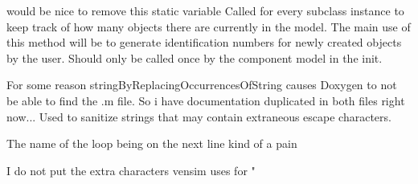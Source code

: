 
\begin{DoxyRefList}
\item[\label{todo__todo000001}%
\hypertarget{todo__todo000001}{}%
Global \hyperlink{interface_component_a3d13675a50c2e37e16e1b7858e5510e4}{\mbox{[}Component generate\-I\-D\mbox{]}} ]would be nice to remove this static variable Called for every subclass instance to keep track of how many objects there are currently in the model. The main use of this method will be to generate identification numbers for newly created objects by the user. Should only be called once by the component model in the init.  
\item[\label{todo__todo000002}%
\hypertarget{todo__todo000002}{}%
Global \hyperlink{interface_component_a875d9dcfa3e019c2cf685524707e0427}{\mbox{[}Component sanitize\-String\-:\mbox{]}} ]For some reason string\-By\-Replacing\-Occurrences\-Of\-String causes Doxygen to not be able to find the .m file. So i have documentation duplicated in both files right now... Used to sanitize strings that may contain extraneous escape characters.  
\item[\label{todo__todo000003}%
\hypertarget{todo__todo000003}{}%
Global \hyperlink{interface_file_i_o_a2bb3d58ae1f0fac924e831a424e1365b}{\mbox{[}File\-I\-O import\-Model\-:\mbox{]}} ]The name of the loop being on the next line kind of a pain  
\item[\label{todo__todo000004}%
\hypertarget{todo__todo000004}{}%
Global \hyperlink{interface_variable_a4c7e0685f86eef33404c7ada436db10a}{\mbox{[}Variable create\-Variable\-Output\-String\mbox{]}} ]I do not put the extra characters vensim uses for " 
\end{DoxyRefList}